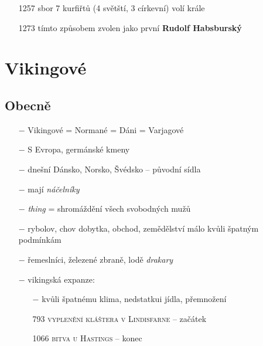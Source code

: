 \documentclass{article}
\begin{document}
\begin{itemize}
\begin{itemize}
        \end{itemize}
    \item[1257] sbor 7 kurfiřtů (4 světští, 3 církevní) volí krále
    \item[1273] tímto způsobem zvolen jako první \textbf{Rudolf Habsburský}
\end{itemize}

\section*{Vikingové}
\subsection*{Obecně}
\begin{itemize}
    \vspace{-0.5em}
    \setlength\itemsep{0.15em}
    \item[$-$] Vikingové = Normané = Dáni = Varjagové
    \item[$-$] S Evropa, germánské kmeny
    \item[$-$] dnešní Dánsko, Norsko, Švédsko -- původní sídla
    \item[$-$] mají \textit{náčelníky}
    \item[$-$] \textit{thing} = shromáždění všech svobodných mužů
    \item[$-$] rybolov, chov dobytka, obchod, zemědělství málo kvůli špatným podmínkám
    \item[$-$] řemeslníci, železené zbraně, lodě \textit{drakary}
    \item[$-$] vikingská expanze:
        \begin{itemize}
            \vspace{-0.5em}
            \setlength\itemsep{0.15em}
            \item[$-$] kvůli špatnému klima, nedstatkui jídla, přemnožení
            \item[793] \textsc{vyplenění kláštera v Lindisfarne} -- začátek
            \item[1066] \textsc{bitva u Hastings} -- konec
        \end{itemize}
\end{itemize}
\end{document}
